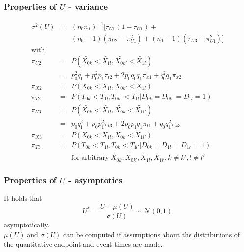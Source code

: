 \documentclass[xcolor=pdftex,dvipsnames,table]{beamer}\usepackage[]{graphicx}\usepackage[]{color}
\begin{document}
\begin{frame} %
\frametitle{Properties of $U$ - variance}
\begin{eqnarray*}
\sigma^2(U) & = & (n_0 n_1)^{-1} \big[ \pi_{U1} (1 - \pi_{U1}) + \\
            &   &                 (n_0 - 1) (\pi_{U2} - \pi_{U1}^2) + 
                                  (n_1 - 1) (\pi_{U3} - \pi_{U1}^2) \big] \\
  \mbox{with} &   & \\
  \pi_{U2} & = & P(\tilde{X_{0k}} < \tilde{X_{1l}}, \tilde{X_{0k'}} < \tilde{X_{1l}}) \\
           & = & p_0^2 q_1 + p_0^2 p_1 \pi_{t2} + 2 p_0 q_0 q_1 \pi_{x1} + q_0^2 q_1 \pi_{x2} \\
  \pi_{X2} & = & P(X_{0k} < X_{1l}, X_{0k'} < X_{1l}) \\
  \pi_{T2} & = & P(T_{0k} < T_{1l}, T_{0k'} < T_{1l} | D_{0k} = D_{0k'} = D_{1l} = 1) \\
  \pi_{U3} & = & P(\tilde{X_{0k}} < \tilde{X_{1l}}, \tilde{X_{0k}} < \tilde{X_{1l'}}) \\
           & = & p_0 q_1^2 + p_0 p_1^2 \pi_{t3} + 2 p_0 p_1 q_1 \pi_{t1} + q_0 q_1^2 \pi_{x3} \\
  \pi_{X3} & = & P(X_{0k} < X_{1l}, X_{0k} < X_{1l'}) \\
  \pi_{T3} & = & P(T_{0k} < T_{1l}, T_{0k} < T_{1l'} | D_{0k} = D_{1l} = D_{1l'} =1)\\
           &   & \mbox{for arbitrary } \tilde{X_{0k}}, \tilde{X_{0k'}}, \tilde{X_{1l}}, 
                                      \tilde{X_{1l'}}, k \ne k', l \ne l'
\end{eqnarray*}
\end{frame}


\begin{frame} %
\frametitle{Properties of $U$ - asymptotics}
It holds that
  $$ U^{*} = \frac{U - \mu(U)}{\sigma(U)} \sim \mathcal{N} (0, 1)$$ asymptotically.\\
\vspace{0.5cm}
$\mu(U)$ and $\sigma(U)$ can be computed if assumptions about the distributions of the quantitative endpoint and 
event times are made.
\end{frame}
\end{document}
